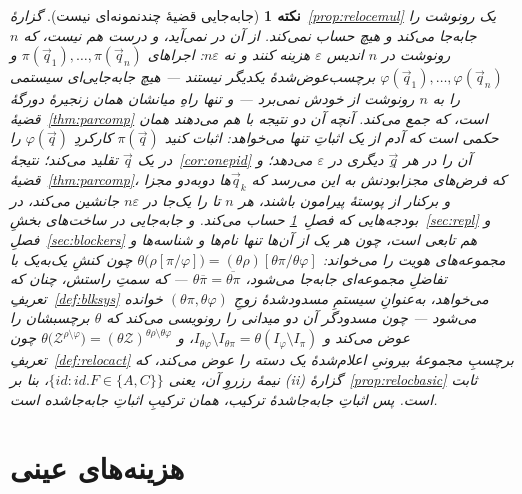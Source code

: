 \documentclass[10pt,oneside,openany]{book}
\newcommand{\Zenv}{\mathcal{Z}}
\newcommand{\id}{id}
\theoremstyle{accentdef}
\newtheorem{remark}[definition]{نکته}
\theoremstyle{accentplain}
\begin{document}
\begin{remark}[جابه‌جایی قضیهٔ چندنمونه‌ای نیست]\label{rem:manyinstances}
گزارهٔ~\ref{prop:relocemul} یک رونوشت را جابه‌جا می‌کند و هیچ حساب نمی‌کند.
از آن در نمی‌آید، و درست هم نیست، که $n$ رونوشت در $n$ اندیس $\varepsilon$
هزینه کنند و نه $n\varepsilon$: اجراهای $\pi(\vec q_1),\dots,\pi(\vec q_n)$
و $\varphi(\vec q_1),\dots,\varphi(\vec q_n)$ برچسب‌عوض‌شدهٔ یکدیگر نیستند
--- هیچ جابه‌جایی‌ای سیستمی را به $n$ رونوشت از خودش نمی‌برد --- و تنها راهِ
میانشان همان زنجیرهٔ دورگهٔ قضیهٔ~\ref{thm:parcomp} است، که جمع می‌کند. آنچه
آن دو نتیجه با هم می‌دهند همان حکمی است که آدم از یک اثباتِ تنها می‌خواهد:
اثبات کنید $\pi(\vec q)$ کارکردِ $\varphi(\vec q)$ را در یک $\vec q$ تقلید
می‌کند؛ نتیجهٔ~\ref{cor:onepid} آن را در هر $\vec q$ِ دیگری در
$\varepsilon$ می‌دهد؛ و قضیهٔ~\ref{thm:parcomp}، که فرض‌های مجزابودنش به
این می‌رسد که $\vec q_k$ها دوبه‌دو مجزا و برکنار از پوستهٔ پیرامون باشند، هر
$n$ تا را یک‌جا در $n\varepsilon$ جانشین می‌کند، در بودجه‌هایی که
فصلِ~\ref{app:conccosts} حساب می‌کند. و جابه‌جایی در ساخت‌های
بخشِ~\ref{sec:repl} و فصلِ~\ref{sec:blockers} هم تابعی است، چون هر یک از
آن‌ها تنها نام‌ها و شناسه‌ها و مجموعه‌های هویت را می‌خواند:
$\theta\bigl(\rho[\pi/\varphi]\bigr) = (\theta\rho)[\theta\pi/\theta\varphi]$
چون کنشِ یک‌به‌یک با تفاضلِ مجموعه‌ای جابه‌جا می‌شود، $\theta\overline{\pi} =
\overline{\theta\pi}$ --- که سمتِ راستش، چنان که تعریفِ~\ref{def:blksys}
می‌خواهد، به‌عنوانِ سیستمِ مسدودشدهٔ زوجِ $(\theta\pi,\theta\varphi)$ خوانده
می‌شود --- چون مسدودگر آن دو میدانی را رونویسی می‌کند که $\theta$ برچسبشان
را عوض می‌کند و $I_{\theta\varphi} \setminus I_{\theta\pi} = \theta(I_\varphi
\setminus I_\pi)$، و $\theta\bigl(\Zenv^{\rho \setminus \varphi}\bigr) =
(\theta\Zenv)^{\theta\rho \setminus \theta\varphi}$ چون
تعریفِ~\ref{def:relocact} برچسبِ مجموعهٔ بیرونیِ اعلام‌شدهٔ یک دسته را عوض
می‌کند، که نیمهٔ رزروِ آن، یعنی $\{\id : \id.F \in \{A,C\}\}$، بنا بر (ii)ِ
گزارهٔ~\ref{prop:relocbasic} ثابت است. پس اثباتِ جابه‌جا‌شدهٔ ترکیب، همان
ترکیبِ اثباتِ جابه‌جا‌شده است.
\end{remark}





\chapter{هزینه‌های عینی}\label{app:conccosts}
\end{document}
